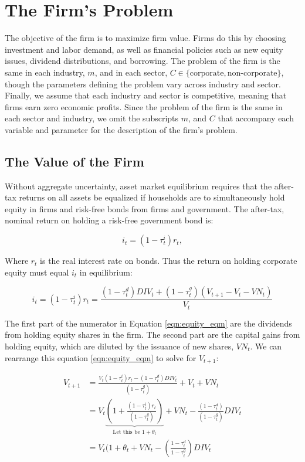 \section{The Firm's Problem}

The objective of the firm is to maximize firm value.  Firms do this by choosing investment and labor demand, as well as financial policies such as new equity issues, dividend distributions, and borrowing.  The problem of the firm is the same in each industry, $m$, and in each sector, $C\in\{\text{corporate},\text{non-corporate}\}$, though the parameters defining the problem vary across industry and sector.  Finally, we assume that each industry and sector is competitive, meaning that firms earn zero economic profits.  Since the problem of the firm is the same in each sector and industry, we omit the subscripts $m$, and $C$ that accompany each variable and parameter for the description of the firm's problem.

\subsection{The Value of the Firm}

Without aggregate uncertainty, asset market equilibrium requires that the after-tax returns on all assets be equalized if households are to simultaneously hold equity in firms and risk-free bonds from firms and government.  The after-tax, nominal return on holding a risk-free government bond is:

\begin{equation}
\label{eqn:r}
i_{t}=(1-\tau^{i}_{t})r_{t},
\end{equation}

\noindent\noindent Where $r_{t}$ is the real interest rate on bonds.  Thus the return on holding corporate equity must equal $i_{t}$ in equilibrium:

\begin{equation}
\label{eqn:equity_eqm}
i_{t}=(1-\tau^{i}_{t})r_{t}=\frac{(1-\tau^{d}_{t})DIV_{t}+(1-\tau^{g}_{t})(V_{t+1}-V_{t}-VN_{t})}{V_{t}}
\end{equation}

The first part of the numerator in Equation \ref{eqn:equity_eqm} are the dividends from holding equity shares in the firm.  The second part are the capital gains from holding equity, which are diluted by the issuance of new shares, $VN_{t}$.  We can rearrange this equation \ref{eqn:equity_eqm} to solve for $V_{t+1}$:

\begin{equation}
\label{eqn:v_t1}
\begin{split}
V_{t+1}&=\frac{V_{t}(1-\tau^{i}_{t})r_{t}-(1-\tau^{d}_{t})DIV_{t}}{(1-\tau^{g}_{t})}+V_{t}+VN_{t} \\
 & = V_{t}\underbrace{\left(1+\frac{(1-\tau^{i}_{t})r_{t}}{(1-\tau^{g}_{t})}\right)}_{\text{Let this be }1+\theta_{t}} + VN_{t} - \frac{(1-\tau^{d}_{t})}{(1-\tau^{g}_{t})}DIV_{t} \\
 & = V_{t}(1+\theta_{t} + VN_{t} - \left(\frac{1-\tau^{d}_{t}}{1-\tau^{g}_{t}}\right)DIV_{t}
\end{split}
\end{equation}


